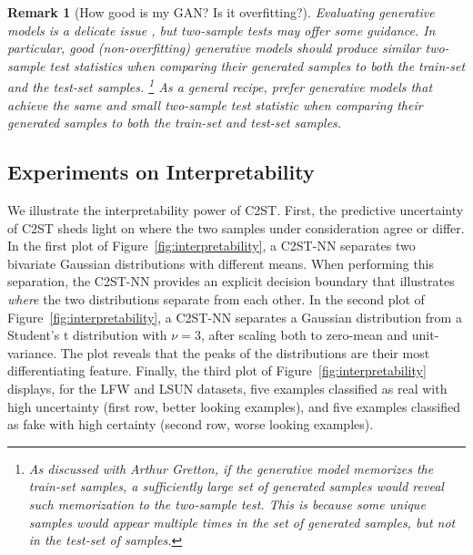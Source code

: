 \documentclass[a4paper]{article}
\newtheorem{remark}{Remark}
\begin{document}
  \begin{remark}[How good is my GAN? Is it overfitting?]
  Evaluating generative models is a delicate issue \citep{theis2015note},
  but two-sample tests may offer some guidance.
  In particular, good (non-overfitting) generative models should produce similar two-sample test
  statistics when comparing their generated samples to both the train-set and the test-set samples.
  \footnote{As discussed with
  Arthur Gretton, if the generative model memorizes the train-set samples, a sufficiently
  large set of generated samples would reveal such memorization to the two-sample test. This
  is because some unique samples would appear multiple times in the set of generated samples,
  but not in the test-set of samples.}
  As a general recipe, prefer generative models that achieve the \emph{same and small} two-sample
  test statistic when comparing their generated samples to both the train-set and test-set samples.
  \end{remark}

  \subsection{Experiments on Interpretability}

  We illustrate the interpretability power of C2ST.
  First, the predictive uncertainty of C2ST sheds light on
  where the two samples under consideration agree or differ. In the first plot
  of Figure~\ref{fig:interpretability}, a C2ST-NN separates two bivariate
  Gaussian
  distributions with different means. When performing this separation, the
  C2ST-NN provides an explicit decision boundary that illustrates \emph{where}
  the two distributions separate from each other. In the second plot of
  Figure~\ref{fig:interpretability}, a C2ST-NN separates a Gaussian
  distribution from a Student's t distribution with $\nu = 3$,
  after scaling both to zero-mean and unit-variance. The plot reveals that
  the peaks of the distributions are their most differentiating feature.
  Finally, the third plot of
  Figure~\ref{fig:interpretability} displays, for the LFW and LSUN datasets,
  five examples classified as real with high uncertainty (first row,
  better looking examples), and five examples classified as fake with
  high certainty (second row, worse looking examples).
\end{document}

